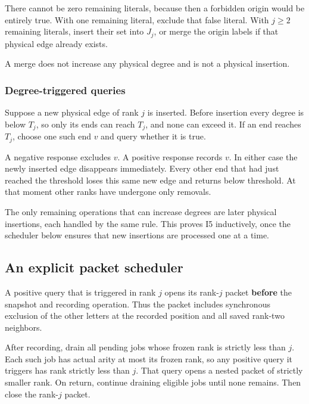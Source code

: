 There cannot be zero remaining literals, because then a forbidden origin would be entirely true. With one remaining literal, exclude that false literal. With \(j\ge2\) remaining literals, insert their set into \(J_j\), or merge the origin labels if that physical edge already exists.

A merge does not increase any physical degree and is not a physical insertion.

\subsubsection{Degree-triggered queries}\label{degree-triggered-queries}

Suppose a new physical edge of rank \(j\) is inserted. Before insertion every degree is below \(T_j\), so only its ends can reach \(T_j\), and none can exceed it. If an end reaches \(T_j\), choose one such end \(v\) and query whether it is true.

A negative response excludes \(v\). A positive response records \(v\). In either case the newly inserted edge disappears immediately. Every other end that had just reached the threshold loses this same new edge and returns below threshold. At that moment other ranks have undergone only removals.

The only remaining operations that can increase degrees are later physical insertions, each handled by the same rule. This proves I5 inductively, once the scheduler below ensures that new insertions are processed one at a time.

\subsection{An explicit packet scheduler}\label{an-explicit-packet-scheduler}

A positive query that is triggered in rank \(j\) opens its rank-\(j\) packet \textbf{before} the snapshot and recording operation. Thus the packet includes synchronous exclusion of the other letters at the recorded position and all saved rank-two neighbors.

After recording, drain all pending jobs whose frozen rank is strictly less than \(j\). Each such job has actual arity at most its frozen rank, so any positive query it triggers has rank strictly less than \(j\). That query opens a nested packet of strictly smaller rank. On return, continue draining eligible jobs until none remains. Then close the rank-\(j\) packet.

